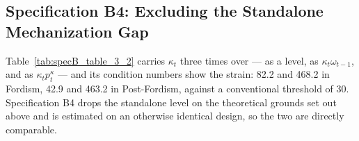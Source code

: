 \documentclass[11pt,a4paper]{article}
\begin{document}
\begin{table}[H]
\begin{tabular}{p{5.5cm}p{2.5cm}p{2.5cm}p{2.5cm}p{2.5cm}}
\end{tabular}
\end{table}

\FloatBarrier
\subsection{Specification B4: Excluding the Standalone Mechanization Gap}
\label{sec:specB4}

Table~\ref{tab:specB_table_3_2} carries $\kappa_t$ three times over --- as a level, as $\kappa_t \omega_{t-1}$, and as $\kappa_t p_t^{\kappa}$ --- and its condition numbers show the strain: 82.2 and 468.2 in Fordism, 42.9 and 463.2 in Post-Fordism, against a conventional threshold of 30. Specification B4 drops the standalone level on the theoretical grounds set out above and is estimated on an otherwise identical design, so the two are directly comparable.
\end{document}
